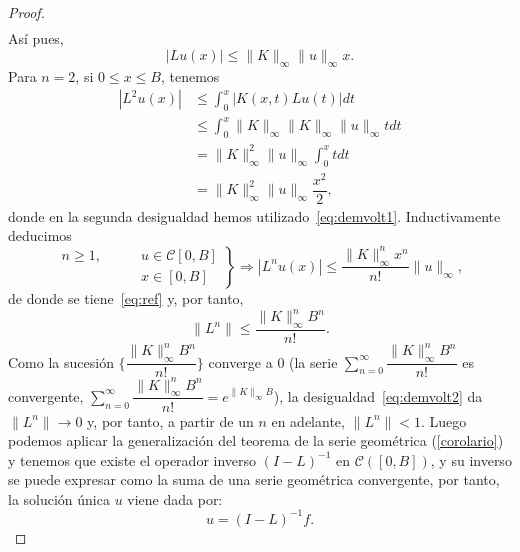 \begin{proof}
\begin{equation}
\begin{split}
		\end{split}
	\end{equation}
	Así pues,
	\begin{equation}\label{eq:demvolt1}
		|Lu(x)| \leqslant \lVert K \rVert_\infty \lVert u \rVert_\infty x.
	\end{equation}
	Para $n = 2$, si $0 \leqslant x \leqslant B$, tenemos
	\begin{equation}
		\begin{split}
			|L^2u(x)| & \leqslant \int_{0}^{x}|K(x,t)Lu(t)|dt \\
			& \leqslant \int_{0}^{x} \lVert K \rVert_\infty \lVert K \rVert_\infty \lVert u \rVert_\infty tdt\\
			& =  \lVert K \rVert_\infty^2 \lVert u \rVert_\infty \int_{0}^{x}tdt \\
			& = \lVert K \rVert_\infty^2 \lVert u \rVert_\infty \dfrac{x^2}{2},
		\end{split}
	\end{equation}
	donde en la segunda desigualdad hemos utilizado~\eqref{eq:demvolt1}. Inductivamente deducimos
	\begin{equation}
		\left.\begin{split}
			n \geqslant 1, \qquad & u \in \mathcal{C}[0,B]\\
			& x \in [0,B]
		\end{split}\right\rbrace \Rightarrow |L^nu(x)| \leqslant \dfrac{\lVert K \rVert_\infty^nx^n}{n!}\lVert u \rVert_\infty,
	\end{equation}
	de donde se tiene~\eqref{eq:ref} y, por tanto, 
	\begin{equation}\label{eq:demvolt2}
		\lVert L^n \rVert \leqslant \dfrac{\lVert K \rVert_\infty^nB^n}{n!}.
	\end{equation}
	Como la sucesión $\{\dfrac{\lVert K \rVert_\infty^nB^n}{n!}\}$ converge a $0$ (la serie $\sum_{n=0}^{\infty}\dfrac{\lVert K \rVert_\infty^nB^n}{n!}$ es convergente, $\sum_{n=0}^{\infty}\dfrac{\lVert K \rVert_\infty^nB^n}{n!} = e^{\lVert K \rVert_\infty B}$), la desigualdad~\eqref{eq:demvolt2} da $\lVert L^n \rVert \rightarrow 0$ y, por tanto, a partir de un $n$ en adelante, $\lVert L^n \rVert < 1$.
	Luego podemos aplicar la generalización del teorema de la serie geométrica (\autoref{corolario}) y tenemos que existe el operador inverso $(I-L)^{-1}$ en $\mathcal{C}([0,B])$, y su inverso se puede expresar como la suma de una serie geométrica convergente, por tanto,  la solución única $u$ viene dada por:
	\begin{equation}
		u = (I-L)^{-1}f.
	\end{equation}
\end{proof}
